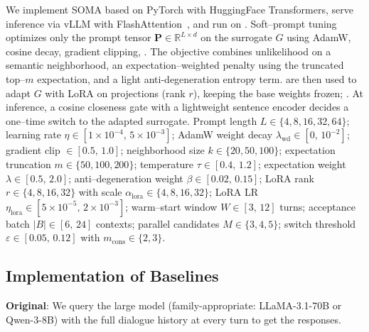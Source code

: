 We implement SOMA based on PyTorch with HuggingFace Transformers, serve inference via vLLM with FlashAttention~\citep{shah2024flashattention}, and run on . Soft–prompt tuning optimizes only the prompt tensor $\mathbf{P}\!\in\!\mathbb{R}^{L\times d}$ on the surrogate $G$ using AdamW, cosine decay, gradient clipping, . The objective combines unlikelihood on a semantic neighborhood, an expectation–weighted penalty using the truncated top–$m$ expectation, and a light anti-degeneration entropy term.  are then used to adapt $G$ with LoRA on  projections (rank $r$), keeping the base weights frozen; . At inference, a cosine closeness gate with a lightweight sentence encoder decides a one–time switch to the adapted surrogate.  Prompt length $L\!\in\!\{4, 8,16,32,64\}$; learning rate $\eta\!\in\![1\!\times\!10^{-4},\,5\!\times\!10^{-3}]$; AdamW weight decay $\lambda_{\mathrm{wd}}\!\in\![0,\,10^{-2}]$; gradient clip $\in[0.5,\,1.0]$; neighborhood size $k\!\in\!\{20,50,100\}$; expectation truncation $m\!\in\!\{50,100,200\}$; temperature $\tau\!\in\![0.4,\,1.2]$; expectation weight $\lambda\!\in\![0.5,\,2.0]$; anti–degeneration weight $\beta\!\in\![0.02,\,0.15]$; LoRA rank $r\!\in\!\{4, 8,16,32\}$ with scale $\alpha_{\text{lora}}\!\in\!\{4, 8,16,32\}$; LoRA LR $\eta_{\text{lora}}\!\in\![5\!\times\!10^{-5},\,2\!\times\!10^{-3}]$; warm–start window $W\!\in\![3,\,12]$ turns; acceptance batch $|B|\!\in\![6,\,24]$ contexts; parallel candidates $M\!\in\!\{3,4,5\}$; switch threshold $\varepsilon\!\in\![0.05,\,0.12]$ with $m_{\text{cons}}\!\in\!\{2,3\}$. 


\subsection{Implementation of Baselines}\label{sec:app_baseline}

\textbf{Original}: We query the large model (family-appropriate: LLaMA-3.1-70B or Qwen-3-8B) with the full dialogue history at every turn to get the responses.

